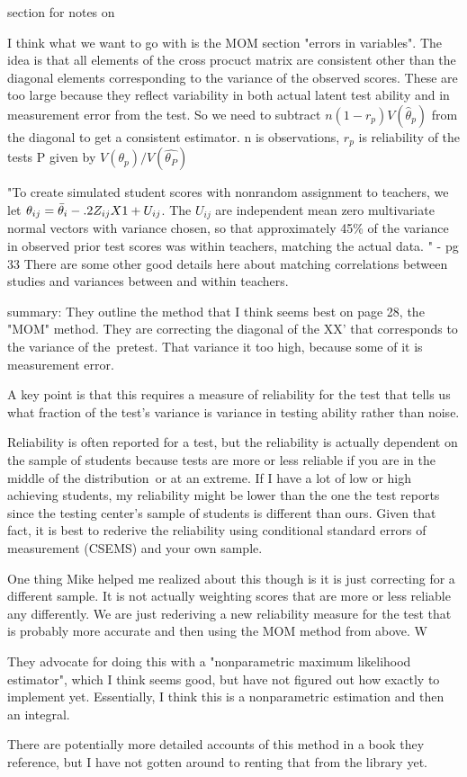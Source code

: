 \documentclass[letterpaper,12pt]{article}
\begin{document}
section for notes on \cite{Lockwood2014}

I think what we want to go with is the MOM section "errors in variables". The idea is that all elements of the cross procuct matrix are consistent other than the diagonal elements corresponding to the variance of the observed scores. These are too large because they reflect variability in both actual latent test ability and in measurement error from the test. So we need to subtract $n(1-r_p)V(\hat{\theta}_p)$ from the diagonal to get a consistent estimator. n is observations, $r_p$ is reliability of the tests P given by $V(\theta_p)/V(\hat{\theta_P})$


"To create simulated student scores with nonrandom assignment to teachers, we let $\theta_{ij} = \Bar{\theta}_i - .2 Z_{ij} X 1 + U_{ij}$. The $U_{ij}$ are independent mean zero multivariate
 normal vectors with variance chosen, so that approximately 45\% of the variance in observed prior test scores was within teachers, matching the actual data. " - pg 33 There are some other good details here about matching correlations between studies and variances between and within teachers. 
 
 
 summary: 
They outline the method that I think seems best on page 28, the "MOM" method. They are correcting the diagonal of the XX' that corresponds to the variance of the pretest. That variance it too high, because some of it is measurement error.

A key point is that this requires a measure of reliability for the test that tells us what fraction of the test's variance is variance in testing ability rather than noise.

Reliability is often reported for a test, but the reliability is actually dependent on the sample of students because tests are more or less reliable if you are in the middle of the distribution or at an extreme. If I have a lot of low or high achieving students, my reliability might be lower than the one the test reports since the testing center's sample of students is different than ours. Given that fact, it is best to rederive the reliability using conditional standard errors of measurement (CSEMS) and your own sample.

One thing Mike helped me realized about this though is it is just correcting for a different sample. It is not actually weighting scores that are more or less reliable any differently. We are just rederiving a new reliability measure for the test that is probably more accurate and then using the MOM method from above. W

They advocate for doing this with a "nonparametric maximum likelihood estimator", which I think seems good, but have not figured out how exactly to implement yet. Essentially, I think this is a nonparametric estimation and then an integral.

There are potentially more detailed accounts of this method in a book they reference, but I have not gotten around to renting that from the library yet.


    
\end{document}
